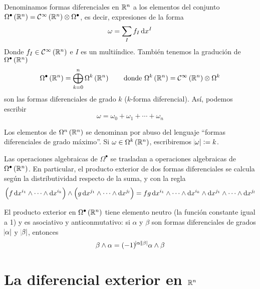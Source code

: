 \begin{defi}
    Denominamos formas diferenciales en $\mathbb{R}^n$ a los elementos del conjunto $\Omega^\bullet\left( \mathbb{R}^n \right) = \mathcal{C}^\infty\left( \mathbb{R}^n \right) \otimes
    \Omega^\bullet$, es decir, expresiones de la forma
    \[
        \omega = \sum_I f_I \dif x^I
    \]
    Donde $f_I \in \mathcal{C}^{\infty}\left( \mathbb{R}^n \right)$ e $I$ es un multiíndice. Tambi\'en tenemos la gradución de $\Omega^\bullet \left( \mathbb{R}^n \right)$
    \[
        \Omega^\bullet \left( \mathbb{R}^n \right) = \bigoplus^n_{k=0} \Omega^k \left( \mathbb{R}^n \right) \qquad \text{donde }
        \Omega^k \left( \mathbb{R}^n \right) = \mathcal{C}^\infty \left( \mathbb{R}^n \right) \otimes \Omega^k
    \]
    son las formas diferenciales de grado $k$ ($k$-forma diferencial). Así, podemos escribir
    \[
        \omega = \omega_0 + \omega_1 + \cdots + \omega_n
    \]

    Los elementos de $\Omega^n\left( \mathbb{R}^n \right)$ se denominan por abuso del lenguaje ``formas diferenciales de grado máximo''. Si
    $\omega \in \Omega^k \left( \mathbb{R}^n \right)$, escribiremos $\abs{\omega} := k$.
\end{defi}

\begin{defi}
    Las operaciones algebraicas de $\Omega^\bullet$ se trasladan a operaciones algebraicas de $\Omega^\bullet \left( \mathbb{R}^n \right)$. En particular,
    el producto exterior de dos formas diferenciales se calcula según la distributividad respecto de la suma, y con la regla
    \[
        \left( f \dif x^{i_1} \wedge \cdots \wedge \dif x^{i_k} \right) \wedge \left( g \dif x^{j_1} \wedge \cdots \wedge \dif x^{j_l} \right) =
        fg \dif x^{i_1} \wedge \cdots \wedge \dif x^{i_k} \wedge \dif x^{j_1} \wedge \cdots \wedge \dif x^{j_l}
    \]
\end{defi}

\begin{prop}
    El producto exterior en $\Omega^\bullet \left( \mathbb{R}^n \right)$ tiene elemento neutro (la función constante igual a 1) y es asociativo
    y anticonmutativo: si $\alpha$ y $\beta$ son formas diferenciales de grados $\abs{\alpha}$ y $\abs{\beta}$, entonces
    \[
        \beta \wedge \alpha = (-1)^{\abs{\alpha}\abs{\beta}} \alpha \wedge \beta
    \]
\end{prop}

\section{La diferencial exterior en $\mathbb{R}^n$}

